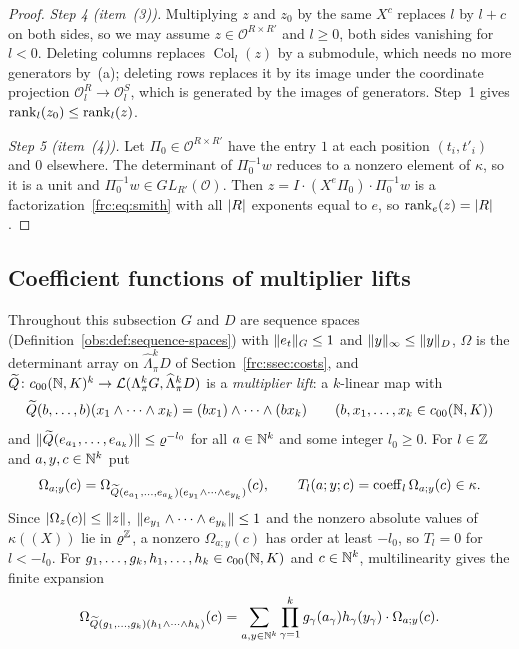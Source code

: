 \begin{proof}
\emph{Step 4 (item~(3)).} Multiplying $z$ and $z_0$ by the same $X^c$ replaces $l$ by $l+c$ on both sides, so we may
assume $z\in\mathcal O^{R\times R'}$ and $l\ge0$, both sides vanishing for $l<0$. Deleting columns replaces
$\operatorname{Col}_l(z)$ by a submodule, which needs no more generators by~(a); deleting rows replaces it by its image
under the coordinate projection $\mathcal O_l^R\to\mathcal O_l^S$, which is generated by the images of generators. Step~1 gives $\operatorname{rank}_l(z_0)\le\operatorname{rank}_l(z)$.

\emph{Step 5 (item~(4)).} Let $\Pi_0\in\mathcal O^{R\times R'}$ have the entry $1$ at each position $(t_i,t'_i)$ and $0$
elsewhere. The determinant of $\Pi_0^{-1}w$ reduces to a nonzero element of $\kappa$, so it is a unit and
$\Pi_0^{-1}w\in GL_{R'}(\mathcal O)$. Then $z=I\cdot(X^e\Pi_0)\cdot\Pi_0^{-1}w$ is a factorization~\eqref{frc:eq:smith}
with all $\lvert R\rvert$ exponents equal to $e$, so $\operatorname{rank}_e(z)=\lvert R\rvert$.
\end{proof}

\subsection{Coefficient functions of multiplier lifts}\label{frc:ssec:coefficients}
Throughout this subsection $G$ and $D$ are sequence spaces (Definition~\ref{obs:def:sequence-spaces}) with
$\lVert e_t\rVert_G\le1$ and $\lVert y\rVert_\infty\le\lVert y\rVert_D$, $\Omega$ is the determinant array on $\widehat\Lambda^k_\pi D$ of
Section~\ref{frc:ssec:costs}, and $\widetilde Q\colon c_{00}(\mathbb N,K)^k\to\mathcal L(\Lambda^k_\pi G,\widehat\Lambda^k_\pi D)$ is a
\emph{multiplier lift}: a $k$\nobreakdash-linear map with
\begin{equation}\label{frc:eq:multiplier-lift}
 \widetilde Q(b,\dots,b)(x_1\wedge\dots\wedge x_k)=(bx_1)\wedge\dots\wedge(bx_k)\qquad(b,x_1,\dots,x_k\in c_{00}(\mathbb N,K))
\end{equation}
and $\lVert \widetilde Q(e_{a_1},\dots,e_{a_k})\rVert\le\varrho^{-l_0}$ for all $a\in\mathbb N^k$ and some integer $l_0\ge0$. For
$l\in\mathbb Z$ and $a,y,c\in\mathbb N^k$ put
\[
 \Omega_{a;y}(c)=\Omega_{\widetilde Q(e_{a_1},\dots,e_{a_k})(e_{y_1}\wedge\dots\wedge e_{y_k})}(c),\qquad
 T_l(a;y;c)=\operatorname{coeff}_l\Omega_{a;y}(c)\in\kappa .
\]
Since $\lvert \Omega_z(c)\rvert\le\lVert z\rVert$, $\lVert e_{y_1}\wedge\dots\wedge e_{y_k}\rVert\le1$ and the nonzero absolute values of
$\kappa((X))$ lie in $\varrho^\mathbb Z$, a nonzero $\Omega_{a;y}(c)$ has order at least $-l_0$, so $T_l=0$ for $l<-l_0$. For
$g_1,\dots,g_k,h_1,\dots,h_k\in c_{00}(\mathbb N,K)$ and $c\in\mathbb N^k$, multilinearity gives the finite expansion
\begin{equation}\label{frc:eq:expand}
 \Omega_{\widetilde Q(g_1,\dots,g_k)(h_1\wedge\dots\wedge h_k)}(c)=\sum_{a,y\in\mathbb N^k}\prod_{\gamma=1}^kg_\gamma(a_\gamma)
 h_\gamma(y_\gamma)\cdot\Omega_{a;y}(c).
\end{equation}

